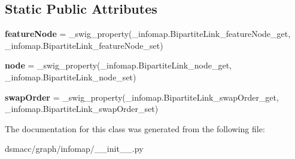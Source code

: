 \subsection*{Static Public Attributes}
\begin{DoxyCompactItemize}
\item 
\mbox{\label{classdsmacc_1_1graph_1_1infomap_1_1BipartiteLink_a115bf5cebb4e903f31c1a31417854acc}} 
{\bfseries feature\+Node} = \+\_\+swig\+\_\+property(\+\_\+infomap.\+Bipartite\+Link\+\_\+feature\+Node\+\_\+get, \+\_\+infomap.\+Bipartite\+Link\+\_\+feature\+Node\+\_\+set)
\item 
\mbox{\label{classdsmacc_1_1graph_1_1infomap_1_1BipartiteLink_af269c59df813e0c79b6ca2e8d8a95dfa}} 
{\bfseries node} = \+\_\+swig\+\_\+property(\+\_\+infomap.\+Bipartite\+Link\+\_\+node\+\_\+get, \+\_\+infomap.\+Bipartite\+Link\+\_\+node\+\_\+set)
\item 
\mbox{\label{classdsmacc_1_1graph_1_1infomap_1_1BipartiteLink_a1fb189bf5dac3b7a7bf6568dd77c6a91}} 
{\bfseries swap\+Order} = \+\_\+swig\+\_\+property(\+\_\+infomap.\+Bipartite\+Link\+\_\+swap\+Order\+\_\+get, \+\_\+infomap.\+Bipartite\+Link\+\_\+swap\+Order\+\_\+set)
\end{DoxyCompactItemize}


The documentation for this class was generated from the following file\+:\begin{DoxyCompactItemize}
\item 
dsmacc/graph/infomap/\+\_\+\+\_\+init\+\_\+\+\_\+.\+py\end{DoxyCompactItemize}
